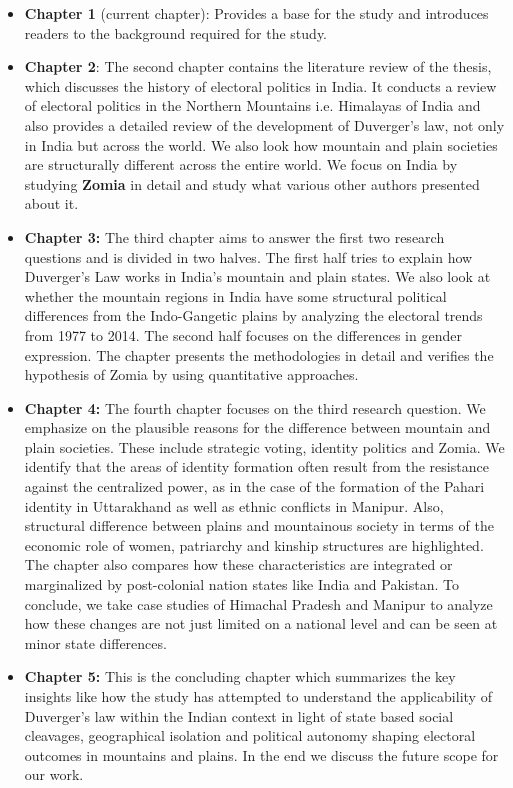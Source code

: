 \begin{sloppypar}
\begin{itemize}
    \item \textbf{Chapter 1} (current chapter): Provides a base for the study and introduces readers to the background required for the study.
    \item \textbf{Chapter 2}: The second chapter contains the literature review of the thesis, which discusses the history of electoral politics in India. It conducts a review of electoral politics in the Northern Mountains i.e. Himalayas of India and also provides a detailed review of the development of Duverger's law, not only in India but across the world.  We also look how mountain and plain societies are structurally different across the entire world. We focus on India by studying \textbf{Zomia} in detail and study what various other authors presented about it.
    \item \textbf{Chapter 3:} The third chapter aims to answer the first two research questions and is divided in two halves. The first half tries to explain how Duverger's Law works in India's mountain and plain states. We also look at whether the mountain regions in India have some structural political differences from the Indo-Gangetic plains by analyzing the electoral trends from 1977 to 2014. The second half focuses on the differences in gender expression. The chapter presents the methodologies in detail and verifies the hypothesis of Zomia by using quantitative approaches.
    \item \textbf{Chapter 4:} The fourth chapter focuses on the third research question. We emphasize on the plausible reasons for the difference between mountain and plain societies. These include  strategic voting, identity politics and Zomia. We identify that the areas of identity formation often result from the resistance against the centralized power, as in the case of the formation of the Pahari identity in Uttarakhand as well as ethnic conflicts in Manipur. Also, structural difference between plains and mountainous society in terms of the economic role of women, patriarchy and kinship structures are highlighted. The chapter also compares how these characteristics are integrated or marginalized by post-colonial nation states like India and Pakistan. To conclude, we take case studies of Himachal Pradesh and Manipur to analyze how these changes are not just limited on a national level and can be seen at minor state differences.
    \item \textbf{Chapter 5:} This is the concluding chapter which summarizes the key insights like how the study  has attempted to understand the applicability of Duverger's law within the Indian context in light of state based social cleavages, geographical isolation and political autonomy shaping electoral outcomes in mountains and plains. In the end we discuss the future scope for our work.
\end{itemize}

\end{sloppypar}